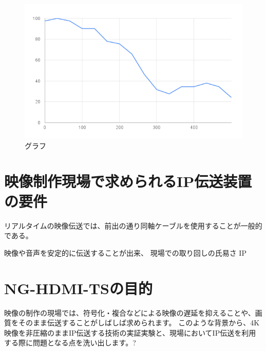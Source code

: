\begin{figure}[htbp]
  \begin{center}
    \includegraphics[bb=0 0 600 371,width=14cm]{img/mv-delay-result-graph.png}
  \end{center}
  \caption{グラフ}
  \label{fig:mv-delay-result-graph}
\end{figure}

\section{映像制作現場で求められるIP伝送装置の要件}

リアルタイムの映像伝送では、前出の通り同軸ケーブルを使用することが一般的である。

映像や音声を安定的に伝送することが出来、
現場での取り回しの氏易さ
IP

\section{NG-HDMI-TSの目的}

映像の制作の現場では、符号化・複合などによる映像の遅延を抑えることや、画質をそのまま伝送することがしばしば求められます。
このような背景から、4K映像を非圧縮のままIP伝送する技術の実証実験と、現場においてIP伝送を利用する際に問題となる点を洗い出します。?

